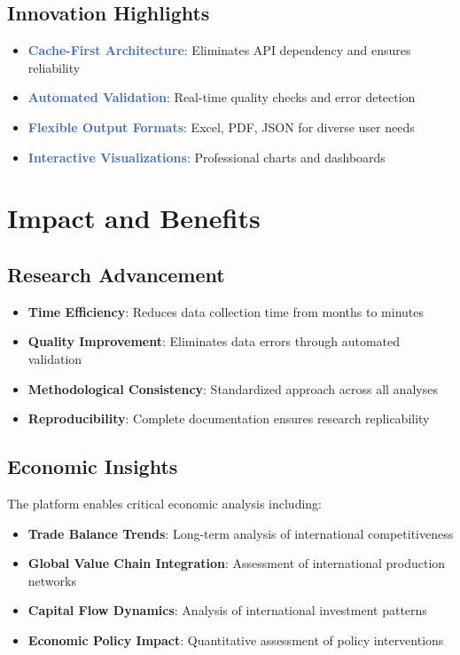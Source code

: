 \documentclass[11pt,a4paper]{article}
\begin{document}
\subsection{Innovation Highlights}
\begin{itemize}
    \item \textcolor{highlight}{\textbf{Cache-First Architecture}}: Eliminates API dependency and ensures reliability
    \item \textcolor{highlight}{\textbf{Automated Validation}}: Real-time quality checks and error detection
    \item \textcolor{highlight}{\textbf{Flexible Output Formats}}: Excel, PDF, JSON for diverse user needs
    \item \textcolor{highlight}{\textbf{Interactive Visualizations}}: Professional charts and dashboards
\end{itemize}

\section{Impact and Benefits}

\subsection{Research Advancement}
\begin{itemize}
    \item \textbf{Time Efficiency}: Reduces data collection time from months to minutes
    \item \textbf{Quality Improvement}: Eliminates data errors through automated validation
    \item \textbf{Methodological Consistency}: Standardized approach across all analyses
    \item \textbf{Reproducibility}: Complete documentation ensures research replicability
\end{itemize}

\subsection{Economic Insights}
The platform enables critical economic analysis including:

\begin{itemize}
    \item \textbf{Trade Balance Trends}: Long-term analysis of international competitiveness
    \item \textbf{Global Value Chain Integration}: Assessment of international production networks
    \item \textbf{Capital Flow Dynamics}: Analysis of international investment patterns
    \item \textbf{Economic Policy Impact}: Quantitative assessment of policy interventions
\end{itemize}
\end{document}
